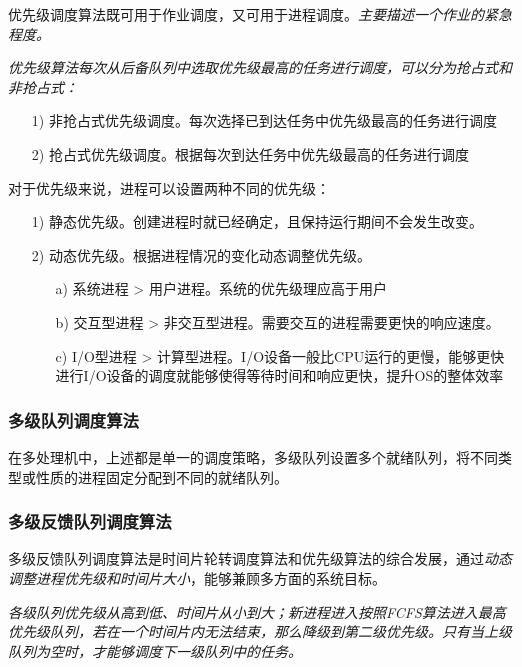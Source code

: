     优先级调度算法既可用于作业调度，又可用于进程调度。\emph{主要描述一个作业的紧急程度。}

    \emph{优先级算法每次从后备队列中选取优先级最高的任务进行调度，可以分为抢占式和非抢占式：}

\begin{itemize}
    \item [1)] 非抢占式优先级调度。每次选择已到达任务中优先级最高的任务进行调度
    \item [2)] 抢占式优先级调度。根据每次到达任务中优先级最高的任务进行调度
\end{itemize}

    对于优先级来说，进程可以设置两种不同的优先级：

\begin{itemize}
    \item [1)] 静态优先级。创建进程时就已经确定，且保持运行期间不会发生改变。
    \item [2)] 动态优先级。根据进程情况的变化动态调整优先级。
    \begin{itemize}
        \item [a)] 系统进程 > 用户进程。系统的优先级理应高于用户
        \item [b)] 交互型进程 > 非交互型进程。需要交互的进程需要更快的响应速度。
        \item [c)] I/O型进程 > 计算型进程。I/O设备一般比CPU运行的更慢，能够更快进行I/O设备的调度就能够使得等待时间和响应更快，提升OS的整体效率
    \end{itemize}
\end{itemize}

\subsubsection{多级队列调度算法}

    在多处理机中，上述都是单一的调度策略，多级队列设置多个就绪队列，将不同类型或性质的进程固定分配到不同的就绪队列。

\subsubsection{多级反馈队列调度算法}

    多级反馈队列调度算法是时间片轮转调度算法和优先级算法的综合发展，通过\emph{\color{red}动态调整进程优先级和时间片大小}，能够兼顾多方面的系统目标。

    \emph{各级队列优先级从高到低、时间片从小到大；新进程进入按照FCFS算法进入最高优先级队列，{\color{red}若在一个时间片内无法结束，那么降级到第二级优先级}。只有当上级队列为空时，才能够调度下一级队列中的任务。}

